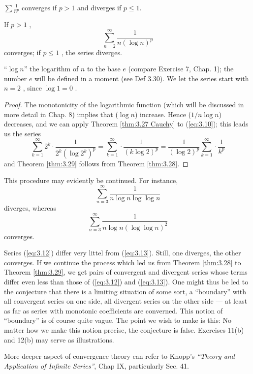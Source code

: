 \begin{thm}
    \label{thm:3.28}
    $\sum \frac{1}{n^p}$ converges if $p>1$ and diverges if $p\leq 1$. 
\end{thm}

\begin{thm}
    \label{thm:3.29}
    If $p > 1$ ,
    \begin{equation}
        \label{eq:3.10}
        \sum_{n=2}^{\infty} \frac{1}{n (\log n)^p}
    \end{equation}
    converges; if $p \leq 1$ , the series diverges.
\end{thm}

``$\log n$'' the logarithm of $n$ to the base $e$ (compare Exercise 7, Chap. 1);
the number $e$ will be defined in a moment (see Def 3.30). We let the series start with $n=2$ , since $\log 1 = 0$ .

\begin{proof}
    The monotonicity of the logarithmic function (which will be discussed in more detail in Chap. 8) implies that ($\log n$) increase. Hence ($1/n \log n$) decreases, and we can apply Theorem \ref{thm:3.27 Cauchy} to (\ref{eq:3.10}); this leads us the series
    \begin{equation}
        \label{eq:3.11}
        \sum_{k=1}^{\infty}2^k\cdot\frac{1}{2^k (\log 2^k)^p} = 
        \sum_{k=1}^{\infty}\cdot\frac{1}{(k\log 2)^p} =
        \frac{1}{(\log 2)^p}\sum_{k=1}^{\infty}\cdot\frac{1}{k^p}
    \end{equation}
    and Theorem \ref{thm:3.29} follows from Theorem \ref{thm:3.28}.
\end{proof}


This procedure may evidently be continued. For instance,
\begin{equation}
    \label{eq:3.12}
    \sum_{n=3}^{\infty}\frac{1}{n \log n \log \log n}
\end{equation}
diverges, whereas
\begin{equation}
    \label{eq:3.13}
    \sum_{n=3}^{\infty}\frac{1}{n \log n (\log \log n)^2}
\end{equation}
converges.

Series (\ref{eq:3.12}) differ very littel from (\ref{eq:3.13}). Still, one diverges, the other converges.
If we continue the process which led us from Theorem \ref{thm:3.28} to Theorem \ref{thm:3.29}, we get pairs of convergent and divergent series whose terms differ even less than those of (\ref{eq:3.12}) and (\ref{eq:3.13}).
One might thus be led to the conjecture that there is a limiting situation of some sort, a ``boundary'' with all convergent series on one side, all divergent series on the other side --- at least as far as series with monotonic coefficients are converned. 
This notion of ``boundary'' is of course quite vague.
The point we wish to make is this: No matter how we make this notion precise, the conjecture is false. Exercises 11(b) and 12(b) may serve as illustrations.

More deeper aspect of convergence theory can refer to Knopp's \emph{``Theory and Application of Infinite Series''}, Chap IX, particularly Sec. 41.
